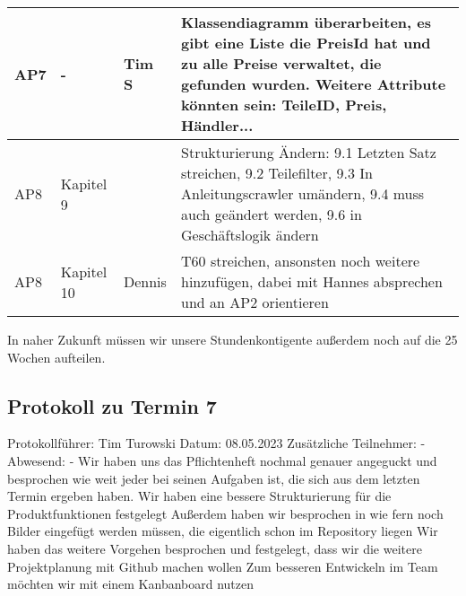 \begin{flushleft}
\begin{longtable}{p{3cm}p{2cm}p{2cm}p{6cm}}
		AP7 & - & Tim S &  Klassendiagramm überarbeiten, es gibt eine Liste die PreisId hat und zu alle Preise verwaltet, die gefunden wurden. Weitere Attribute könnten sein: TeileID, Preis, Händler...\\ \midrule
		AP8 & Kapitel 9 &  & Strukturierung Ändern: 9.1 Letzten Satz streichen, 9.2 Teilefilter, 9.3 In Anleitungscrawler umändern, 9.4 muss auch geändert werden, 9.6 in Geschäftslogik ändern \\ \midrule
		AP8 & Kapitel 10 & Dennis &  T60 streichen, ansonsten noch weitere hinzufügen, dabei mit Hannes absprechen und an AP2 orientieren \\ 
		\bottomrule
	\end{longtable}
\end{flushleft}
In naher Zukunft müssen wir unsere Stundenkontigente außerdem noch auf die 25 Wochen aufteilen. 
\newpage
\subsection{Protokoll zu Termin 7}
Protokollführer: Tim Turowski \newline
Datum: 08.05.2023 \newline
Zusätzliche Teilnehmer: - \newline
Abwesend: - \newline \newline
Wir haben uns das Pflichtenheft nochmal genauer angeguckt und besprochen wie weit jeder bei seinen Aufgaben ist, die sich aus dem letzten Termin ergeben haben. \newline
Wir haben eine bessere Strukturierung für die Produktfunktionen festgelegt \newline
Außerdem haben wir besprochen in wie fern noch Bilder eingefügt werden müssen, die eigentlich schon im Repository liegen \newline
Wir haben das weitere Vorgehen besprochen und festgelegt, dass wir die weitere Projektplanung mit Github machen wollen \newline
Zum besseren Entwickeln im Team möchten wir mit einem Kanbanboard nutzen \newline
\newpage
